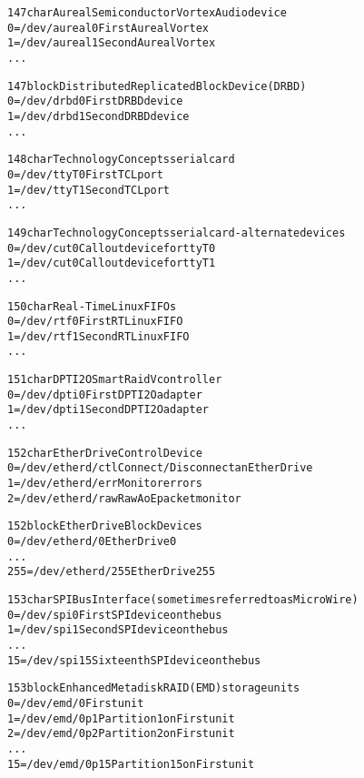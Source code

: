 \documentclass[a4paper,8pt,english]{sphinxmanual}
\begin{document}
\begin{alltt}
 147 char       Aureal Semiconductor Vortex Audio device
                  0 = /dev/aureal0      First Aureal Vortex
                  1 = /dev/aureal1      Second Aureal Vortex
                    ...

 147 block      Distributed Replicated Block Device (DRBD)
                  0 = /dev/drbd0        First DRBD device
                  1 = /dev/drbd1        Second DRBD device
                    ...

 148 char       Technology Concepts serial card
                  0 = /dev/ttyT0        First TCL port
                  1 = /dev/ttyT1        Second TCL port
                    ...

 149 char       Technology Concepts serial card - alternate devices
                  0 = /dev/cut0         Callout device for ttyT0
                  1 = /dev/cut0         Callout device for ttyT1
                    ...

 150 char       Real-Time Linux FIFOs
                  0 = /dev/rtf0         First RTLinux FIFO
                  1 = /dev/rtf1         Second RTLinux FIFO
                    ...

 151 char       DPT I2O SmartRaid V controller
                  0 = /dev/dpti0        First DPT I2O adapter
                  1 = /dev/dpti1        Second DPT I2O adapter
                    ...

 152 char       EtherDrive Control Device
                  0 = /dev/etherd/ctl   Connect/Disconnect an EtherDrive
                  1 = /dev/etherd/err   Monitor errors
                  2 = /dev/etherd/raw   Raw AoE packet monitor

 152 block      EtherDrive Block Devices
                  0 = /dev/etherd/0     EtherDrive 0
                    ...
                255 = /dev/etherd/255   EtherDrive 255

 153 char       SPI Bus Interface (sometimes referred to as MicroWire)
                  0 = /dev/spi0         First SPI device on the bus
                  1 = /dev/spi1         Second SPI device on the bus
                    ...
                 15 = /dev/spi15        Sixteenth SPI device on the bus

 153 block      Enhanced Metadisk RAID (EMD) storage units
                  0 = /dev/emd/0        First unit
                  1 = /dev/emd/0p1      Partition 1 on First unit
                  2 = /dev/emd/0p2      Partition 2 on First unit
                    ...
                 15 = /dev/emd/0p15     Partition 15 on First unit


\end{alltt}
\end{document}

